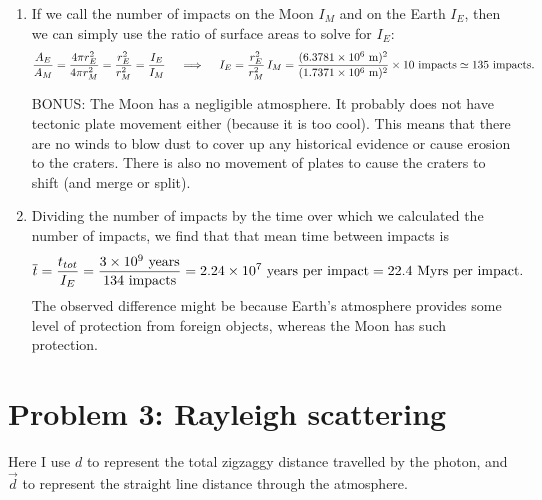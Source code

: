 \documentclass[11pt,letterpaper]{article}
\begin{document}
\begin{enumerate}[label=(\alph*)]
    \item If we call the number of impacts on the Moon $I_M$ and on the Earth $I_E$, then we can simply use the ratio of surface areas to solve for $I_E$:
        \begin{equation*}
            \frac{A_E}{A_M} = \frac{4\pi r_E^2}{4\pi r_M^2} = \frac{r_E^2}{r_M^2} = \frac{I_E}{I_M} \\\quad
            \implies \quad I_E = \frac{r_E^2}{r_M^2}\,I_M = \frac{(6.3781\times 10^{6}~{\rm m})^2}{(1.7371\times 10^{6}~{\rm m})^2}\times 10~{\rm impacts} \simeq 135~{\rm impacts}. 
        \end{equation*}

        BONUS: The Moon has a negligible atmosphere. It probably does not have tectonic plate movement either (because it is too cool). This means that there are no winds to blow dust to cover up any historical evidence or cause erosion to the craters. There is also no movement of plates to cause the craters to shift (and merge or split). 

    \item Dividing the number of impacts by the time over which we calculated the number of impacts, we find that that mean time between impacts is
        \begin{equation*}
            \overline{t} = \frac{t_{tot}}{I_E} = \frac{3\times 10^{9}~{\rm years}}{134~{\rm impacts}} = 2.24\times 10^{7}~\text{years per impact} = 22.4~\text{Myrs per impact}.
        \end{equation*}
        The observed difference might be because Earth's atmosphere provides some level of protection from foreign objects, whereas the Moon has such protection.
\end{enumerate}


\section*{Problem 3: Rayleigh scattering}

Here I use $d$ to represent the total zigzaggy distance travelled by the photon, and $\vec{d}$ to represent the straight line distance through the atmosphere. 
\end{document}
